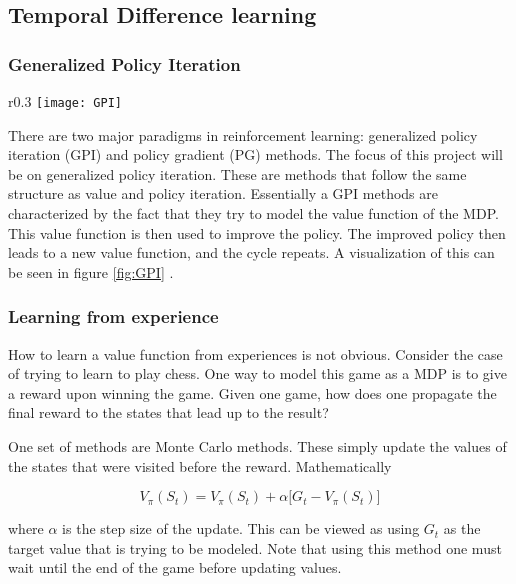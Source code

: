 \subsection{Temporal Difference learning}

\subsubsection{Generalized Policy Iteration}

\begin{wrapfigure}[12]{r}{0.3\textwidth} %
    \vspace*{-1cm}
    \centering
    \texttt{[image: GPI]}
    \caption{\textbf{Visualization of GPI.} Taken from p. 86 \cite{sutton_barto_2018}}
    \label{fig:GPI}
\end{wrapfigure}

There are two major paradigms in reinforcement learning: generalized policy iteration (GPI) and policy gradient (PG) methods. The focus of this project will be on generalized policy iteration. These are methods that follow the same structure as value and policy iteration. Essentially a GPI methods are characterized by the fact that they try to model the value function of the MDP. This value function is then used to improve the policy. The improved policy then leads to a new value function, and the cycle repeats. A visualization of this can be seen in figure \ref{fig:GPI} \citep[p.~86]{sutton_barto_2018}.

\subsubsection{Learning from experience}

How to learn a value function from experiences is not obvious. Consider the case of trying to learn to play chess. One way to model this game as a MDP is to give a reward upon winning the game. Given one game, how does one propagate the final reward to the states that lead up to the result?

One set of methods are Monte Carlo methods. These simply update the values of the states that were visited before the reward. Mathematically 

\begin{equation}
    V_\pi(S_t) = V_\pi(S_t) + \alpha \big[G_t - V_\pi(S_t)]
\end{equation}

where $\alpha$ is the step size of the update. This can be viewed as using $G_t$ as the target value that is trying to be modeled. Note that using this method one must wait until the end of the game before updating values.


